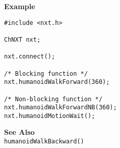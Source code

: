 \noindent
{\bf Example}
\begin{lstlisting}
#include <nxt.h>

ChNXT nxt;

nxt.connect();

/* Blocking function */
nxt.humanoidWalkForward(360);

/* Non-blocking function */
nxt.humanoidWalkForwardNB(360);
nxt.humanoidMotionWait();
\end{lstlisting}

\noindent
{\bf See Also}\\
\texttt{humanoidWalkBackward()}

